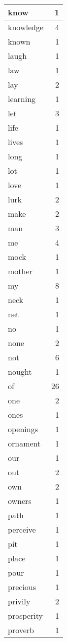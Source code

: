 \begin{center}
\begin{longtable}{l|r}
know & 1\\ \hline 
knowledge & 4\\ \hline 
known & 1\\ \hline 
laugh & 1\\ \hline 
law & 1\\ \hline 
lay & 2\\ \hline 
learning & 1\\ \hline 
let & 3\\ \hline 
life & 1\\ \hline 
lives & 1\\ \hline 
long & 1\\ \hline 
lot & 1\\ \hline 
love & 1\\ \hline 
lurk & 2\\ \hline 
make & 2\\ \hline 
man & 3\\ \hline 
me & 4\\ \hline 
mock & 1\\ \hline 
mother & 1\\ \hline 
my & 8\\ \hline 
neck & 1\\ \hline 
net & 1\\ \hline 
no & 1\\ \hline 
none & 2\\ \hline 
not & 6\\ \hline 
nought & 1\\ \hline 
of & 26\\ \hline 
one & 2\\ \hline 
ones & 1\\ \hline 
openings & 1\\ \hline 
ornament & 1\\ \hline 
our & 1\\ \hline 
out & 2\\ \hline 
own & 2\\ \hline 
owners & 1\\ \hline 
path & 1\\ \hline 
perceive & 1\\ \hline 
pit & 1\\ \hline 
place & 1\\ \hline 
pour & 1\\ \hline 
precious & 1\\ \hline 
privily & 2\\ \hline 
prosperity & 1\\ \hline 
proverb & 1\\ \hline 

\end{longtable}
\end{center}
